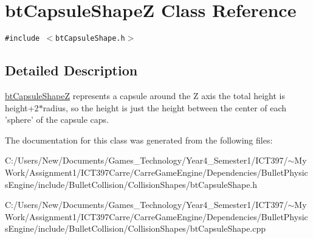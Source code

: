 \hypertarget{classbt_capsule_shape_z}{
\section{btCapsuleShapeZ Class Reference}
\label{classbt_capsule_shape_z}
}
{\tt \#include $<$btCapsuleShape.h$>$}



\subsection{Detailed Description}
\hyperlink{classbt_capsule_shape_z}{btCapsuleShapeZ} represents a capsule around the Z axis the total height is height+2$\ast$radius, so the height is just the height between the center of each 'sphere' of the capsule caps. 

The documentation for this class was generated from the following files:\begin{CompactItemize}
\item 
C:/Users/New/Documents/Games\_\-Technology/Year4\_\-Semester1/ICT397/$\sim$My Work/Assignment1/ICT397Carre/CarreGameEngine/Dependencies/BulletPhysicsEngine/include/BulletCollision/CollisionShapes/btCapsuleShape.h\item 
C:/Users/New/Documents/Games\_\-Technology/Year4\_\-Semester1/ICT397/$\sim$My Work/Assignment1/ICT397Carre/CarreGameEngine/Dependencies/BulletPhysicsEngine/include/BulletCollision/CollisionShapes/btCapsuleShape.cpp\end{CompactItemize}
